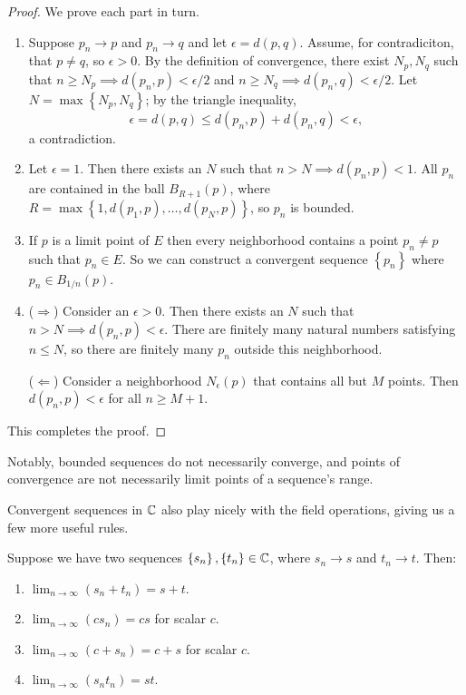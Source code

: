 \documentclass[../m131main.tex]{subfiles}
\begin{document}
\begin{proof}
    We prove each part in turn.
    \begin{enumerate}[label=(\alph*)]
        \item Suppose $p_n \to p$ and $p_n \to q$ and let $\epsilon = d(p,q)$.
        Assume, for contradiciton, that $p \neq q$, so $\epsilon > 0$.
        By the definition of convergence, there exist $N_p, N_q$ such that $n \geq N_p \implies d(p_n, p) < \epsilon / 2$ and $n \geq N_q \implies d(p_n, q) < \epsilon / 2$.
        Let $N = \max \left\{ N_p, N_q \right\}$; by the triangle inequality,
        \[ \epsilon = d(p,q) \leq d(p_n, p) + d(p_n, q) < \epsilon, \]
        a contradiction.

        \item Let $\epsilon = 1$.
        Then there exists an $N$ such that $n > N \implies d(p_n, p) < 1$.
        All $p_n$ are contained in the ball $B_{R+1}(p)$, where $R = \max \left\{ 1, d(p_1, p), \ldots, d(p_N, p) \right\}$, so $p_n$ is bounded.

        \item If $p$ is a limit point of $E$ then every neighborhood contains a point $p_n \neq p$ such that $p_n \in E$.
        So we can construct a convergent sequence $\left\{ p_n \right\}$ where $p_n \in B_{1 / n}(p)$.

        \item ($\Rightarrow$)
        Consider an $\epsilon > 0$.
        Then there exists an $N$ such that $n > N \implies d(p_n, p) < \epsilon$.
        There are finitely many natural numbers satisfying $n \leq N$, so there are finitely many $p_n$ outside this neighborhood.

        ($\Leftarrow$)
        Consider a neighborhood $N_\epsilon (p)$ that contains all but $M$ points.
        Then $d(p_n, p) < \epsilon$ for all $n \geq M + 1$.
    \end{enumerate}
    This completes the proof.
\end{proof}

Notably, bounded sequences do not necessarily converge, and points of convergence are not necessarily limit points of a sequence's range.

Convergent sequences in $\mathbb{C}$ also play nicely with the field operations, giving us a few more useful rules.

\begin{theorem}
    Suppose we have two sequences $\left\{ s_n \right\}, \left\{ t_n \right\} \in \mathbb{C}$, where $s_n \to s$ and $t_n \to t$.
    Then:
    \begin{enumerate}[label=(\alph*)]
        \item $\lim_{n \to \infty} (s_n + t_n) = s + t$.
        \item $\lim_{n \to \infty} (cs_n) = cs$ for scalar $c$. 
        \item $\lim_{n \to \infty} (c + s_n) = c + s$ for scalar $c$.
        \item $\lim_{n \to \infty} (s_n t_n) = st$.
    \end{enumerate}
\end{theorem}
\end{document}
